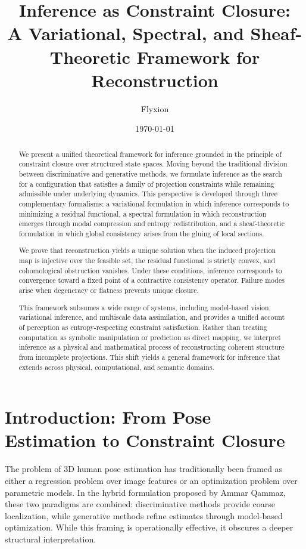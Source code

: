 \documentclass[12pt]{article}
\title{\textbf{Inference as Constraint Closure:\\
A Variational, Spectral, and Sheaf-Theoretic Framework for Reconstruction}}
\author{Flyxion}
\date{\today}
\begin{document}
\maketitle

\begin{abstract}
We present a unified theoretical framework for inference grounded in the principle of constraint closure over structured state spaces. Moving beyond the traditional division between discriminative and generative methods, we formulate inference as the search for a configuration that satisfies a family of projection constraints while remaining admissible under underlying dynamics. This perspective is developed through three complementary formalisms: a variational formulation in which inference corresponds to minimizing a residual functional, a spectral formulation in which reconstruction emerges through modal compression and entropy redistribution, and a sheaf-theoretic formulation in which global consistency arises from the gluing of local sections.

We prove that reconstruction yields a unique solution when the induced projection map is injective over the feasible set, the residual functional is strictly convex, and cohomological obstruction vanishes. Under these conditions, inference corresponds to convergence toward a fixed point of a contractive consistency operator. Failure modes arise when degeneracy or flatness prevents unique closure.

This framework subsumes a wide range of systems, including model-based vision, variational inference, and multiscale data assimilation, and provides a unified account of perception as entropy-respecting constraint satisfaction. Rather than treating computation as symbolic manipulation or prediction as direct mapping, we interpret inference as a physical and mathematical process of reconstructing coherent structure from incomplete projections. This shift yields a general framework for inference that extends across physical, computational, and semantic domains.
\end{abstract}

\newpage

\section{Introduction: From Pose Estimation to Constraint Closure}

The problem of 3D human pose estimation has traditionally been framed as either a regression problem over image features or an optimization problem over parametric models. In the hybrid formulation proposed by Ammar Qammaz, these two paradigms are combined: discriminative methods provide coarse localization, while generative methods refine estimates through model-based optimization. While this framing is operationally effective, it obscures a deeper structural interpretation.
\end{document}
